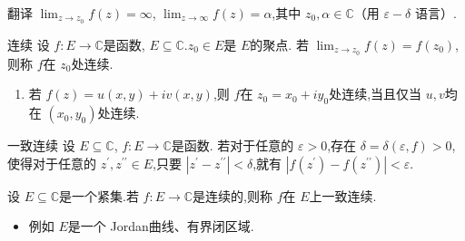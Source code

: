 \documentclass[../../复变函数.tex]{subfiles}
\begin{document}
\begin{exercise}
    翻译 \(  \lim_{z\to z_0} f\left( z \right)= \infty   \), \(  \lim_{z\to \infty} f\left( z \right)= \alpha    \),其中 \(  z_0,\alpha  \in \mathbb{C}   \)（用 \(  \varepsilon - \delta    \) 语言）.   
\end{exercise}

\hspace*{\fill}

\begin{definition}{连续}
    设 \(  f:E\to \mathbb{C}   \)是函数, \(  E\subseteq \mathbb{C}   \).\(  z_0\in E  \)是 \(  E  \)的聚点.
    若 \(  \lim_{z\to z_0}f\left( z \right)= f\left( z_0 \right)    \),则称 \(  f  \)在 \(  z_0  \)处连续.
    
\end{definition}

\begin{remark}
    \begin{enumerate}
        \item  
        若 \(  f\left( z \right)= u\left( x,y \right)+ iv\left( x,y \right)     \),则  \(  f  \)在 \(  z_0 =  x_0+ iy_0  \)处连续,当且仅当 \(  u,v  \)均在 \(  \left( x_0,y_0 \right)   \)处连续.    
    \end{enumerate}
    
\end{remark}

\begin{definition}{一致连续}
    设 \(  E\subseteq \mathbb{C}   \), \(  f:E\to \mathbb{C}   \)是函数.
    若对于任意的 \(  \varepsilon >0  \),存在 \(   \delta   =   \delta  \left( \varepsilon ,f \right)>0   \),使得对于任意的 \(  z ^{\prime} ,z ^{\prime \prime} \in E  \),只要
     \(  \left| z^{\prime} -z ^{\prime \prime}  \right|<  \delta     \),就有 \(  \left| f\left( z^{\prime}  \right)-f\left(  z ^{\prime \prime}  \right)   \right|< \varepsilon    \).       
\end{definition}

\begin{theorem}
    设 \(  E\subseteq \mathbb{C}   \)是一个紧集.若 \(  f: E\to \mathbb{C}   \)是连续的,则称 \(  f  \)在 \(  E  \)上一致连续.  
\end{theorem}

\begin{remark}
    \begin{itemize}
        \item 例如 \(  E  \)是一个 Jordan曲线、有界闭区域.  
    \end{itemize}
\end{remark}
\end{document}
